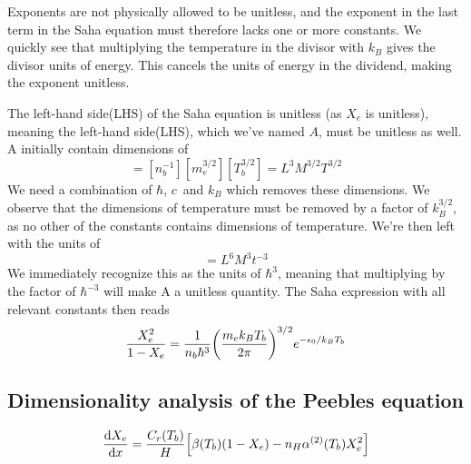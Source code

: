 \documentclass[10pt, a4paper]{article}
\begin{document}
Exponents are not physically allowed to be unitless, and the exponent in the last term in the Saha equation must therefore lacks one or more constants. We quickly see that multiplying the temperature in the divisor with $k_B$ gives the divisor units of energy. This cancels the units of energy in the dividend, making the exponent unitless.

The left-hand side(LHS) of the Saha equation is unitless (as $X_e$ is unitless), meaning the left-hand side(LHS), which we've named $A$, must be unitless as well. A initially contain dimensions of
\begin{equation*}
    [A] = [n_b^{-1}][m_e^{3/2}][T_b^{3/2}] = L^3M^{3/2}T^{3/2}
\end{equation*}
We need a combination of $\hbar$, $c$ and $k_B$ which removes these dimensions. We observe that the dimensions of temperature must be removed by a factor of $k_B^{3/2}$, as no other of the constants contains dimensions of temperature. We're then left with the units of
\begin{equation*}
    [A][k_B^{3/2}] = L^6M^3t^{-3}
\end{equation*}
We immediately recognize this as the units of $\hbar^3$, meaning that multiplying by the factor of $\hbar^{-3}$ will make A a unitless quantity. The Saha expression with all relevant constants then reads
\begin{equation}
    \frac{X_{e}^{2}}{1-X_{e}} = \frac{1}{n_{b}\hbar^3}\qty(\frac{m_{e} k_B T_{b}}{2 \pi})^{3 / 2} e^{-\epsilon_{0} / k_B T_{b}}
\end{equation}


\subsection{Dimensionality analysis of the Peebles equation}

\begin{equation}
    \dv{X_{e}}{x}=\frac{C_{r}\qty(T_{b})}{H}\qty[\beta\qty(T_{b})\qty(1-X_{e})-n_{H} \alpha^{(2)}\qty(T_{b}) X_{e}^{2}]
\end{equation}
\end{document}
